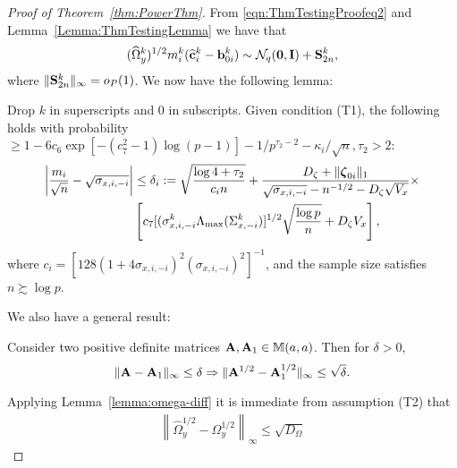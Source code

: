 \begin{proof}[Proof of Theorem~\ref{thm:PowerThm}]
From \eqref{eqn:ThmTestingProofeq2} and Lemma~\ref{Lemma:ThmTestingLemma} we have that
%
\begin{align}
(\widehat \Omega_y^k)^{1/2} m_i^k ( \widehat {{\bf{c}}}_i^k - {\bf{b}}_{0i}^k) \sim {\cal{N}}_q ({\bf 0}, {\mathbf{I}}) + {\mathbf{S}}_{2n}^k,
\end{align}
%
where $\| {\mathbf{S}}_{2n}^k \|_\infty = o_P(1)$. We now have the following lemma:
%
\begin{Lemma}\label{Lemma:PowerThmLemma}
Drop $k$ in superscripts and 0 in subscripts. Given condition (T1), the following holds with probability $\geq 1 - 6c_{6} \exp [-(c_{7}^2-1) \log (p-1)] - 1/p^{\tau_2-2} - \kappa_i / \sqrt n, \tau_2 > 2$:
%
\begin{align}
\left| \frac{m_i}{\sqrt n} - \sqrt{ \sigma_{x,i,-i}} \right| & \leq
\delta_i := \sqrt{ \frac{ \log 4 + \tau_2}{c_i n}} +
\frac{D_\zeta + \| {\boldsymbol{\zeta}}_{0i} \|_1 }{\sqrt{ \sigma_{x,i,-i}} - n^{-1/2} - D_\zeta \sqrt{V_x}} \times \notag\\
& \left[ c_{7} [(\sigma_{x,i,-i}^k \Lambda_{\max} (\Sigma_{x, -i}^k)]^{1/2} \sqrt{ \frac{\log p}{n}} + D_\zeta V_x \right], \label{eqn:PowerThmLemmaEqn}
\end{align}
%
where $c_i = [ 128 (1 + 4 \sigma_{x,i,-i})^2 (\sigma_{x,i,-i})^2 ]^{-1}$, and the sample size satisfies $n \succsim \log p$.
\end{Lemma}
%

We also have a general result:

\begin{Lemma}\label{lemma:omega-diff}
Consider two positive definite matrices ${\mathbf{A}}, {\mathbf{A}}_1 \in {\mathbb{M}}(a,a)$. Then for $\delta > 0$,
%
$$
\| {\mathbf{A}}  -{\mathbf{A}}_1 \|_\infty \leq \delta \Rightarrow \| {\mathbf{A}}^{1/2} - {\mathbf{A}}_1^{1/2} \|_\infty \leq \sqrt{ \delta}.
$$
\end{Lemma}
%

\noindent Applying Lemma~\ref{lemma:omega-diff} it is immediate from assumption (T2) that
%
\begin{align}\label{eqn:omega-sqrt-bound}
\left\| \widehat \Omega_y^{1/2} - \Omega_y^{1/2} \right\|_\infty \leq \sqrt{ D_{\Omega}}
\end{align}


\end{proof}
